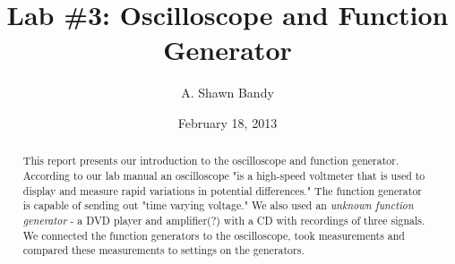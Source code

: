 \documentclass{article}
\begin{document}
\title{Lab \#3:  Oscilloscope and Function Generator}
\author{A. Shawn Bandy}
\date{February 18, 2013}
\maketitle
\begin{abstract}
This report presents our introduction to the oscilloscope and function generator.  According to our lab manual an oscilloscope "is a high-speed voltmeter that is used to display and measure rapid variations in potential differences."  The function generator is capable of sending out "time varying voltage."  We also used an {\it unknown function generator} - a DVD player and amplifier(?) with a CD with recordings of three signals.  We connected the function generators to the oscilloscope, took measurements and compared these measurements to settings on the generators.
\end{abstract}
\end{document}
